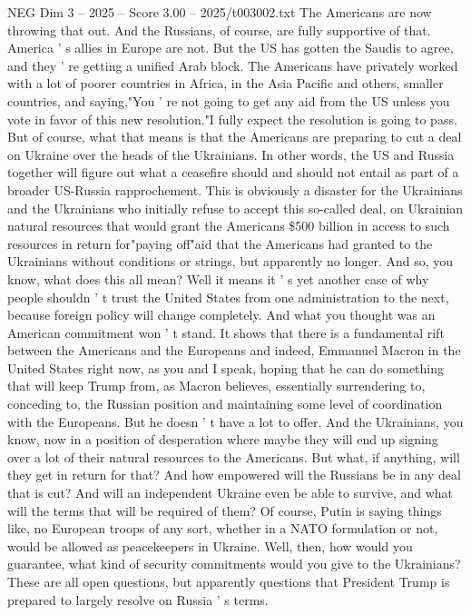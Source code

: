 \begin{textsample}{NEG Dim 3 – 2025 – Score 3.00 – 2025/t003002.txt}
The Americans are now throwing that out.
And the Russians, of course, are fully supportive of that.
America ' s allies in Europe are not.
But the US has gotten the Saudis to agree, and they ' re getting a unified Arab block.
The Americans have privately worked with a lot of poorer countries in Africa, in the Asia Pacific and others, smaller countries, and saying,"You ' re not going to get any aid from the US unless you vote in favor of this new resolution."I fully expect the resolution is going to pass.
But of course, what that means is that the Americans are preparing to cut a deal on Ukraine over the heads of the Ukrainians.
In other words, the US and Russia together will figure out what a ceasefire should and should not entail as part of a broader US-Russia rapprochement.
This is obviously a disaster for the Ukrainians and the Ukrainians who initially refuse to accept this so-called deal, on Ukrainian natural resources that would grant the Americans \$500 billion in access to such resources in return for"paying off"aid that the Americans had granted to the Ukrainians without conditions or strings, but apparently no longer.
And so, you know, what does this all mean?
Well it means it ' s yet another case of why people shouldn ' t trust the United States from one administration to the next, because foreign policy will change completely.
And what you thought was an American commitment won ' t stand.
It shows that there is a fundamental rift between the Americans and the Europeans and indeed, Emmanuel Macron in the United States right now, as you and I speak, hoping that he can do something that will keep Trump from, as Macron believes, essentially surrendering to, conceding to, the Russian position and maintaining some level of coordination with the Europeans.
But he doesn ' t have a lot to offer.
And the Ukrainians, you know, now in a position of desperation where maybe they will end up signing over a lot of their natural resources to the Americans.
But what, if anything, will they get in return for that?
And how empowered will the Russians be in any deal that is cut?
And will an independent Ukraine even be able to survive, and what will the terms that will be required of them?
Of course, Putin is saying things like, no European troops of any sort, whether in a NATO formulation or not, would be allowed as peacekeepers in Ukraine.
Well, then, how would you guarantee, what kind of security commitments would you give to the Ukrainians?
These are all open questions, but apparently questions that President Trump is prepared to largely resolve on Russia ' s terms.

\end{textsample}
